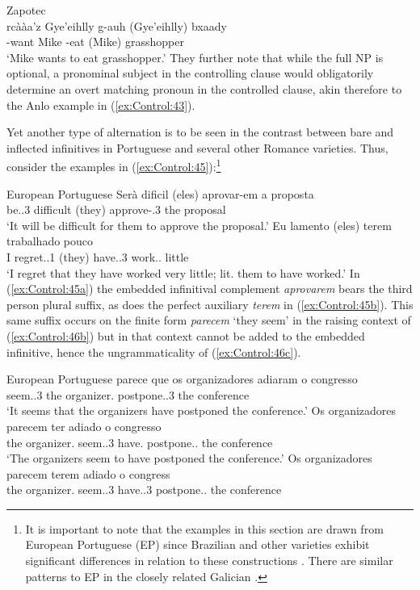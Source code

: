 \documentclass[output=paper,hidelinks]{langscibook}
\begin{document}
\ea\label{ex:Control:44} Zapotec\\
\gll rc{\`a}{\`a}a'z  Gye'eihlly g-auh  (Gye'eihlly) bxaady\\
-want Mike   \IRR-eat (Mike)   grasshopper\\
\glt`Mike wants to eat grasshopper.'
\z
They further note that while the full NP is optional, a pronominal subject in the controlling clause would obligatorily determine an overt matching pronoun in the controlled clause, akin therefore to the Anlo example in (\ref{ex:Control:43}).

Yet another type of alternation is to be seen in the contrast between bare and inflected infinitives in Portuguese and several other Romance varieties. Thus, consider the examples in (\ref{ex:Control:45}):\footnote{It is important to note that the examples in this section are drawn from European Portuguese (EP) since Brazilian and other varieties exhibit significant differences in relation to these constructions \citep{MadeiraFieis2020}. There are similar patterns to EP in the closely related Galician \citep{SheehanBlokzijlCouto2020}.}

\ea\label{ex:Control:45}European Portuguese
\ea\label{ex:Control:45a}\gll  Ser{\`a}   dificil (eles)  aprovar-em   a  proposta\\
{be.\FUT.3\SG} difficult (they) {approve-\INF.3\PL} the proposal\\
\glt    `It will be difficult for them to approve the proposal.'
\ex\label{ex:Control:45b}\gll  Eu  lamento    (eles)  terem    trabalhado  pouco\\
    I  {regret.\PRS.1\SG}  (they) {have.\INF.3\PL} {work.\PST.\PTCP} little\\
\glt    `I regret that they have worked very little; lit. them to have worked.'
\z\z
In (\ref{ex:Control:45a}) the embedded infinitival complement \emph{aprovarem} bears the third person plural suffix, as does the perfect auxiliary \emph{terem} in (\ref{ex:Control:45b}). This same suffix occurs on the finite form \emph{parecem} `they seem' in the raising context of (\ref{ex:Control:46b}) but in that context cannot be added to the embedded infinitive, hence the ungrammaticality of (\ref{ex:Control:46c}).

\ea\label{ex:Control:46}European Portuguese
\ea\label{ex:Control:46a}\gll  parece   que os  organizadores  adiaram o  congresso \\
{seem.\PRS.3\SG}   the {organizer.\PL}  {postpone.\PST.3\PL}  the conference\\
\glt`It seems that the organizers have postponed the conference.'
\ex\label{ex:Control:46b}\gll  Os  organizadores  parecem   ter    adiado o  congresso\\
    the {organizer.\PL}   {seem.\PRS.3\PL} {have.\INF}  {postpone.\PST.\PTCP} the conference\\
\glt    `The organizers seem to have postponed the conference.'
\ex\label{ex:Control:46c}\gll  *Os  organizadores  parecem   terem    adiado o   congress\\
    the {organizer.\PL}   {seem.\PRS.3\PL} {have.\INF.3\PL} {postpone.\PST.\PTCP}  the conference\\
\z\z
                
\end{document}

